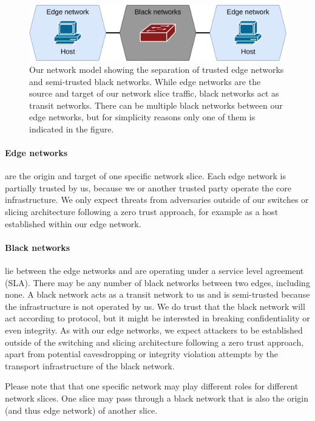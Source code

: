 \begin{figure}[h]
  \centering
  \includegraphics[width=\textwidth]{images/chapter_4/network_model.png}
  \caption[Network model]{Our network model showing the separation of trusted edge networks and semi-trusted black networks. While edge networks are the source and target of our network slice traffic, black networks act as transit networks. There can be multiple black networks between our edge networks, but for simplicity reasons only one of them is indicated in the figure.}
  \label{fig:network_model}
\end{figure}

\paragraph{Edge networks}
are the origin and target of one specific network slice. Each edge network is partially trusted by us, because we or another trusted party operate the core infrastructure. We only expect threats from adversaries outside of our switches or slicing architecture following a zero trust approach, for example as a host established within our edge network.
\paragraph{Black networks}
lie between the edge networks and are operating under a service level agreement (SLA). There may be any number of black networks between two edges, including none. A black network acts as a transit network to us and is semi-trusted because the infrastructure is not operated by us. We do trust that the black network will act according to protocol, but it might be interested in breaking confidentiality or even integrity. As with our edge networks, we expect attackers to be established outside of the switching and slicing architecture following a zero trust approach, apart from potential eavesdropping or integrity violation attempts by the transport infrastructure of the black network.

Please note that that one specific network may play different roles for different network slices. One slice may pass through a black network that is also the origin (and thus edge network) of another slice.

